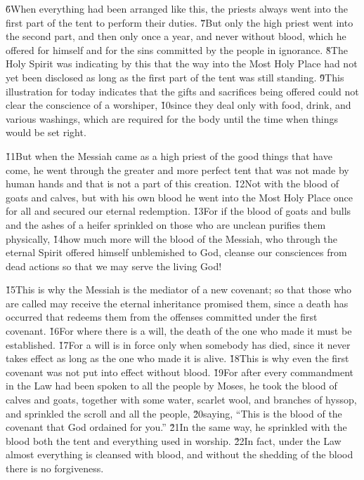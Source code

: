 \v{6}When everything had been arranged like this, the priests always went into the first part of the tent to perform their duties. \v{7}But only the high priest went into the second part, and then only once a year, and never without blood, which he offered for himself and for the sins committed by the people in ignorance. \v{8}The Holy Spirit was indicating by this that the way into the Most Holy Place had not yet been disclosed as long as the first part of the tent was still standing. \v{9}This illustration for today indicates that the gifts and sacrifices being offered could not clear the conscience of a worshiper, \v{10}since they deal only with food, drink, and various washings, which are required for the body until the time when things would be set right.

\v{11}But when the Messiah came as a high priest of the good things that have come, he went through the greater and more perfect tent that was not made by human hands and that is not a part of this creation. \v{12}Not with the blood of goats and calves, but with his own blood he went into the Most Holy Place once for all and secured our eternal redemption. \v{13}For if the blood of goats and bulls and the ashes of a heifer sprinkled on those who are unclean purifies them physically, \v{14}how much more will the blood of the Messiah, who through the eternal Spirit offered himself unblemished to God, cleanse our consciences from dead actions so that we may serve the living God!

\v{15}This is why the Messiah is the mediator of a new covenant; so that those who are called may receive the eternal inheritance promised them, since a death has occurred that redeems them from the offenses committed under the first covenant. \v{16}For where there is a will, the death of the one who made it must be established. \v{17}For a will is in force only when somebody has died, since it never takes effect as long as the one who made it is alive. \v{18}This is why even the first covenant was not put into effect without blood. \v{19}For after every commandment in the Law had been spoken to all the people by Moses, he took the blood of calves and goats, together with some water, scarlet wool, and branches of hyssop, and sprinkled the scroll and all the people, \v{20}saying, ``This is the blood of the covenant that God ordained for you.'' \v{21}In the same way, he sprinkled with the blood both the tent and everything used in worship. \v{22}In fact, under the Law almost everything is cleansed with blood, and without the shedding of the blood there is no forgiveness.

